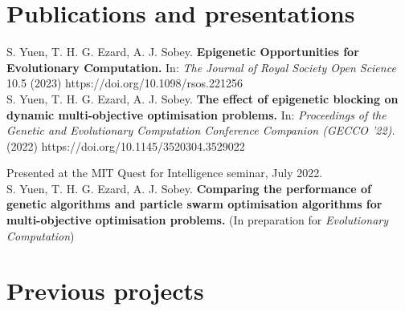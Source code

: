 \documentclass{article}
\newcommand{\n}[0]{\\[\baselineskip]}
\begin{document}
\section*{Publications and presentations}
S. Yuen, T. H. G. Ezard, A. J. Sobey.
\textbf{Epigenetic Opportunities for Evolutionary Computation.} 
In: \textit{The Journal of Royal Society Open Science} 10.5 (2023) 
https://doi.org/10.1098/rsos.221256
\\

S. Yuen, T. H. G. Ezard, A. J. Sobey.
\textbf{The effect of epigenetic blocking on dynamic multi-objective optimisation problems.} 
In: \textit{Proceedings of the Genetic and Evolutionary Computation Conference Companion 
(GECCO ’22).} (2022)
https://doi.org/10.1145/3520304.3529022


Presented at the MIT Quest for Intelligence seminar, July 2022.
\\

S. Yuen, T. H. G. Ezard, A. J. Sobey. \textbf{Comparing the performance of
  genetic algorithms and particle swarm optimisation algorithms for
  multi-objective optimisation problems.}
  (In preparation for \textit{Evolutionary Computation})



\section*{Previous projects}


\end{document}
